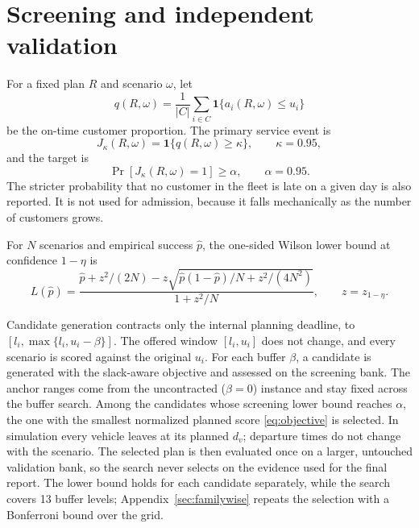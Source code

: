 \documentclass[11pt,a4paper]{article}
\begin{document}
\section{Screening and independent validation}

For a fixed plan $R$ and scenario $\omega$, let
\begin{equation}
 q(R,\omega)=\frac{1}{|C|}\sum_{i\in C}
 \mathbf{1}\{a_i(R,\omega)\leq u_i\}
\end{equation}
be the on-time customer proportion. The primary service event is
\begin{equation}
 J_{\kappa}(R,\omega)=\mathbf{1}\{q(R,\omega)\geq\kappa\},
 \qquad \kappa=0.95,                                        \label{eq:event}
\end{equation}
and the target is
\begin{equation}
 \Pr[J_{\kappa}(R,\omega)=1]\geq\alpha,
 \qquad \alpha=0.95.                                       \label{eq:chance}
\end{equation}
The stricter probability that no customer in the fleet is late on a given day
is also reported. It is not used for admission, because it falls mechanically as
the number of customers grows.

For $N$ scenarios and empirical success $\hat p$, the one-sided Wilson lower
bound at confidence $1-\eta$ is
\begin{equation}
 L(\hat p)=
 \frac{\hat p+z^2/(2N)-z\sqrt{\hat p(1-\hat p)/N+z^2/(4N^2)}}
 {1+z^2/N},\qquad z=z_{1-\eta}.                             \label{eq:wilson}
\end{equation}

Candidate generation contracts only the internal planning deadline, to
$[l_i,\max\{l_i,u_i-\beta\}]$. The offered window $[l_i,u_i]$ does not change,
and every scenario is scored against the original $u_i$. For each buffer
$\beta$, a candidate is generated with the slack-aware objective and assessed on
the screening bank. The anchor ranges come from the uncontracted ($\beta=0$)
instance and stay fixed across the buffer search. Among the candidates whose
screening lower bound reaches $\alpha$, the one with the smallest normalized
planned score \eqref{eq:objective} is selected. In simulation every vehicle
leaves at its planned $d_v$; departure times do not change with the scenario.
The selected plan is then evaluated once on a larger, untouched validation bank,
so the search never selects on the evidence used for the final report. The
lower bound holds for each candidate separately, while the search covers 13
buffer levels; Appendix~\ref{sec:familywise} repeats the selection with a
Bonferroni bound over the grid.
\end{document}
